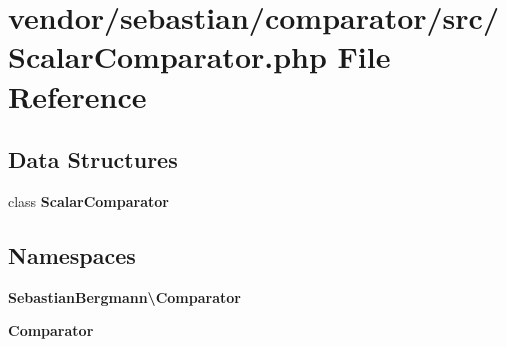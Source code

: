 \section{vendor/sebastian/comparator/src/\+Scalar\+Comparator.php File Reference}
\label{_scalar_comparator_8php}
\subsection*{Data Structures}
\begin{DoxyCompactItemize}
\item 
class {\bf Scalar\+Comparator}
\end{DoxyCompactItemize}
\subsection*{Namespaces}
\begin{DoxyCompactItemize}
\item 
 {\bf Sebastian\+Bergmann\textbackslash{}\+Comparator}
\item 
 {\bf Comparator}
\end{DoxyCompactItemize}
